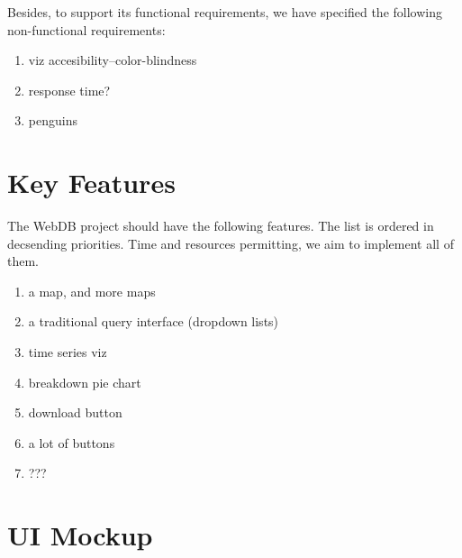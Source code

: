 \documentclass[12pt]{article}
\begin{document}
Besides, to support its functional requirements, we have specified the following non-functional requirements:
\begin{enumerate}
 \item viz accesibility--color-blindness
 \item response time?
 \item penguins
\end{enumerate}

\section{Key Features}
The WebDB project should have the following features. The list is ordered in decsending priorities. Time and resources
permitting, we aim to implement all of them.
\begin{enumerate}
 \item a map, and more maps
 \item a traditional query interface (dropdown lists)
 \item time series viz
 \item breakdown pie chart
 \item download button
 \item a lot of buttons
 \item ???
\end{enumerate}

\section{UI Mockup}
\end{document}
